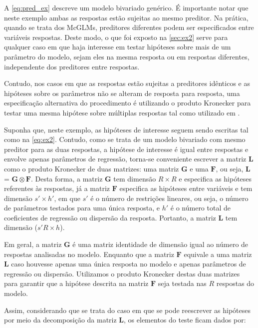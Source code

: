 A \autoref{eq:pred_ex} descreve um modelo bivariado genérico. É importante notar que neste exemplo ambas as respostas estão sujeitas ao mesmo preditor. Na prática, quando se trata dos McGLMs, preditores diferentes podem ser especificados entre variáveis respostas. Deste modo, o que foi exposto na \autoref{sec:ex2} serve para qualquer caso em que haja interesse em testar hipóteses sobre mais de um parâmetro do modelo, sejam eles na mesma resposta ou em respostas diferentes, independente dos preditores entre respostas.

Contudo, nos casos em que as respostas estão sujeitas a preditores idênticos e as hipóteses sobre os parâmetros não se alteram de resposta para resposta, uma especificação alternativa do procedimento é utilizando o produto Kronecker para testar uma mesma hipótese sobre múltiplas respostas tal como utilizado em \citet{plastica}.

Suponha que, neste exemplo, as hipóteses de interesse seguem sendo escritas tal como na \autoref{eq:ex2}. Contudo, como se trata de um modelo bivariado com mesmo preditor para as duas respostas, a hipótese de interesse é igual entre respostas e envolve apenas parâmetros de regressão, torna-se conveniente escrever a matriz $\boldsymbol{L}$ como o produto Kronecker de duas matrizes: uma matriz $\boldsymbol{G}$ e uma $\boldsymbol{F}$, ou seja, $\boldsymbol{L}$ = $\boldsymbol{G} \otimes \boldsymbol{F}$. Desta forma, a matriz $\boldsymbol{G}$ tem dimensão $R \times R$ e especifica as hipóteses referentes às respostas, já a matriz $\boldsymbol{F}$ especifica as hipóteses entre variáveis e tem dimensão ${s}' \times {h}'$, em que ${s}'$ é o número de restrições lineares, ou seja, o número de parâmetros testados para uma única resposta, e ${h}'$ é o número total de coeficientes de regressão ou dispersão da resposta. Portanto, a matriz $\boldsymbol{L}$ tem dimensão (${s}'R \times h$).

Em geral, a matriz $\boldsymbol{G}$ é uma matriz identidade de dimensão igual ao número de respostas analisadas no modelo. Enquanto que a matriz $\boldsymbol{F}$ equivale a uma matriz $\boldsymbol{L}$ caso houvesse apenas uma única resposta no modelo e apenas parâmetros de regressão ou dispersão. Utilizamos o produto Kronecker destas duas matrizes para garantir que a hipótese descrita na matriz $\boldsymbol{F}$ seja testada nas $R$ respostas do modelo.

Assim, considerando que se trata do caso em que se pode reescrever as hipóteses por meio da decomposição da matriz $\boldsymbol{L}$, os elementos do teste ficam dados por:

